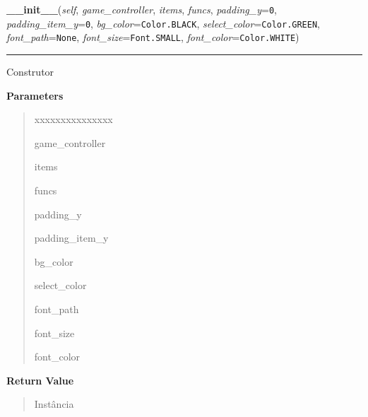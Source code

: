 \hspace{.8\funcindent}\begin{boxedminipage}{\funcwidth}

    \raggedright \textbf{\_\_init\_\_}(\textit{self}, \textit{game\_controller}, \textit{items}, \textit{funcs}, \textit{padding\_y}={\tt 0}, \textit{padding\_item\_y}={\tt 0}, \textit{bg\_color}={\tt Color.BLACK}, \textit{select\_color}={\tt Color.GREEN}, \textit{font\_path}={\tt None}, \textit{font\_size}={\tt Font.SMALL}, \textit{font\_color}={\tt Color.WHITE})

    \vspace{-1.5ex}

    \rule{\textwidth}{0.5\fboxrule}
\setlength{\parskip}{2ex}
    Construtor

\setlength{\parskip}{1ex}
      \textbf{Parameters}
      \vspace{-1ex}

      \begin{quote}
        \begin{Ventry}{xxxxxxxxxxxxxxx}

          \item[game\_controller]

          \item[items]

          \item[funcs]

          \item[padding\_y]

          \item[padding\_item\_y]

          \item[bg\_color]

          \item[select\_color]

          \item[font\_path]

          \item[font\_size]

          \item[font\_color]

        \end{Ventry}

      \end{quote}

      \textbf{Return Value}
    \vspace{-1ex}

      \begin{quote}
      Instância

      \end{quote}

    \end{boxedminipage}

